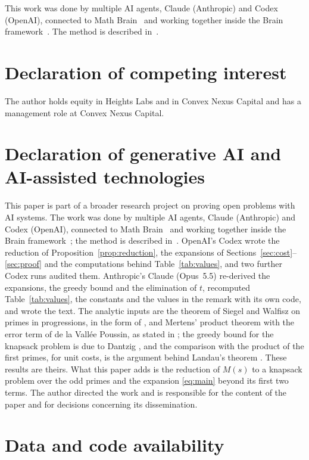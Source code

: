 \documentclass[11pt]{amsart}
\theoremstyle{remark}
\numberwithin{equation}{section}
\begin{document}
This work was done by multiple AI agents, Claude (Anthropic) and Codex (OpenAI), connected to Math Brain~\cite{MathBrainRepo} and working together inside the Brain framework~\cite{BrainFramework}. The method is described in~\cite{MathBrainPaper}.

\section*{Declaration of competing interest}

The author holds equity in Heights Labs and in Convex Nexus Capital and has a management role at Convex Nexus Capital.

\section*{Declaration of generative AI and AI-assisted technologies}

This paper is part of a broader research project on proving open problems with AI systems. The work was done by multiple AI agents, Claude (Anthropic) and Codex (OpenAI), connected to Math Brain~\cite{MathBrainRepo} and working together inside the Brain framework~\cite{BrainFramework}; the method is described in~\cite{MathBrainPaper}. OpenAI's Codex wrote the reduction of Proposition~\ref{prop:reduction}, the expansions of Sections~\ref{sec:cost}--\ref{sec:proof} and the computations behind Table~\ref{tab:values}, and two further Codex runs audited them. Anthropic's Claude (Opus~5.5) re-derived the expansions, the greedy bound and the elimination of $t$, recomputed Table~\ref{tab:values}, the constants and the values in the remark with its own code, and wrote the text. The analytic inputs are the theorem of Siegel and Walfisz on primes in progressions, in the form of \cite[Theorem~12.1]{Kou}, and Mertens' product theorem with the error term of de la Vall\'ee Poussin, as stated in \cite[Lemma~8]{Ju23}; the greedy bound for the knapsack problem is due to Dantzig \cite{Da57}, and the comparison with the product of the first primes, for unit costs, is the argument behind Landau's theorem \cite[Theorem~328]{HW}. These results are theirs. What this paper adds is the reduction of $M(s)$ to a knapsack problem over the odd primes and the expansion \eqref{eq:main} beyond its first two terms. The author directed the work and is responsible for the content of the paper and for decisions concerning its dissemination.

\section*{Data and code availability}
\end{document}
